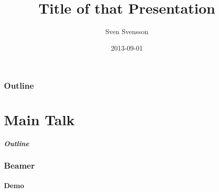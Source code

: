\documentclass[
compress]
{beamer}
\title[Short Title]{Title of that Presentation}
\author[Short Name]{Sven Svensson}
\date{2013-09-01}
\begin{document}
\frame{\titlepage}

\section*{Outline}

\part{Main Talk}
\frame{\partpage}

\frame
{
  \frametitle{Outline}
  \tableofcontents[part=1,pausesections]%
}

\section{Beamer}

\frame{\tableofcontents[current]}

\subsection{Demo}
\end{document}
